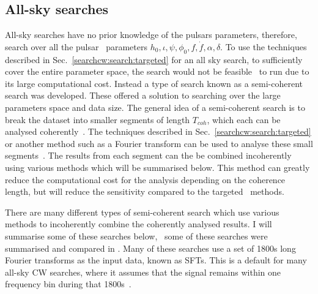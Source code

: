 \subsection{\label{searchcw:search:allsky}All-sky searches}

All-sky searches have no prior knowledge of the pulsars parameters, therefore,
~ search over all the pulsar~ parameters $h_0, \iota, \psi, \phi_0, f,
\dot{f}, \alpha, \delta$. To use the techniques described in
Sec.~\ref{searchcw:search:targeted} for an all sky search, to sufficiently
cover the entire parameter space, the search would not be feasible~ to run due
to its large computational cost.  Instead a type of search known as a
semi-coherent search was developed.  These offered a solution to searching over
the large parameters space and data size.  The general idea of a semi-coherent
search is to break the dataset into smaller segments of length $T_{coh}$, which
each can be analysed coherently~. The techniques described in
Sec.~\ref{searchcw:search:targeted} or another method such as a Fourier
transform can be used to analyse these small segments~.  The results from each
segment can the be combined incoherently using various methods which will be
summarised below.  This method can greatly reduce the computational cost for
the analysis depending on the coherence length, but will reduce the sensitivity
compared to the targeted~ methods. 

There are many different types of semi-coherent search which use various
methods to incoherently combine the coherently analysed results.  I will
summarise some of these searches below,~ some of these searches were summarised and compared in
\citep{walsh2016ComparisonMethods}.  Many of these searches use a set of 1800s
long Fourier transforms as the input data, known as \glspl{SFT}.  This is a
default for many all-sky \gls{CW} searches, where it assumes that the signal
remains within one frequency bin during that 1800s~.


